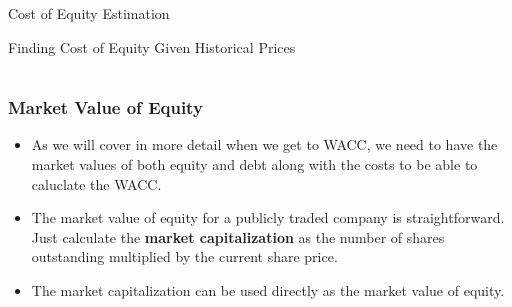 \documentclass[handout, 11pt]{beamer}
\begin{document}
\begin{section}[Equity]{Cost of Equity Estimation}
\begin{frame}
{\begin{block}{Finding Cost of Equity Given Historical Prices}
\begin{tabular*}{\textwidth}{@{\extracolsep{\fill}}cccc}
\end{tabular*}
\end{block}
}
\label{labs:dcf-cost-of-equity-lab-1}
\end{frame}
\begin{frame}
\frametitle{Market Value of Equity}
\begin{itemize}
\item As we will cover in more detail when we get to WACC, we need to have the market values of both equity and debt along with the costs to be able to caluclate the WACC.
\vfill
\item The market value of equity for a publicly traded company is straightforward. Just calculate the \textbf{market capitalization} as the number of shares outstanding multiplied by the current share price.
\vfill
\item The market capitalization can be used directly as the market value of equity.
\end{itemize}
\end{frame}
\end{section}
\end{document}
